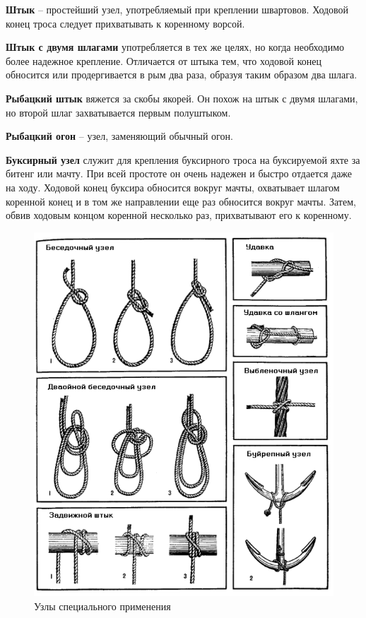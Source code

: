 \documentclass[a4paper, 12pt, twoside, final]{scrbook}
\begin{document}
\textbf{Штык} \--- простейший узел, употребляемый при креплении швартовов. Ходовой конец троса следует прихватывать к коренному ворсой.

\textbf{Штык с двумя шлагами} употребляется в тех же целях, но когда необходимо более надежное крепление. Отличается от штыка тем, что ходовой конец обносится или продергивается в рым два раза, образуя таким образом два шлага.

\textbf{Рыбацкий штык} вяжется за скобы якорей. Он похож на штык с двумя шлагами, но второй шлаг захватывается первым полуштыком.

\textbf{Рыбацкий огон} \--- узел, заменяющий обычный огон.

\textbf{Буксирный узел} служит для крепления буксирного троса на буксируемой яхте за битенг или мачту. При всей простоте он очень надежен и быстро отдается даже на ходу. Ходовой конец буксира обносится вокруг мачты, охватывает шлагом коренной конец и в том же направлении еще раз обносится вокруг мачты. Затем, обвив ходовым концом коренной несколько раз, прихватывают его к коренному.

\begin{figure}[htbp]
   \centering
   \includegraphics{pics/61_Uzly} %
   \caption{Узлы специального применения}
   \label{fig:61}
\end{figure}
\end{document}
